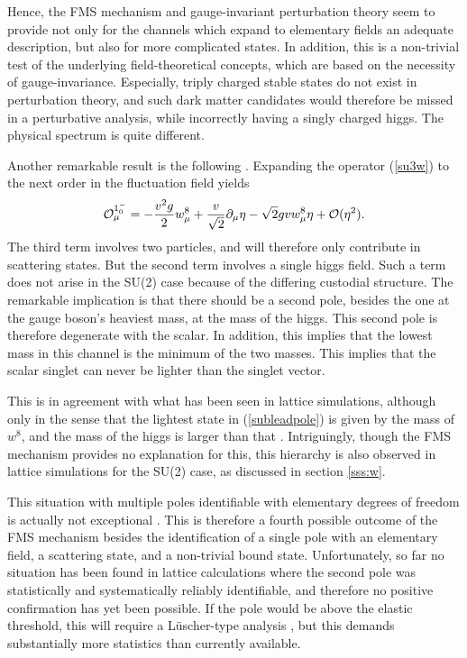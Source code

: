 \documentclass[final,12pt,3p,longtitle]{elsarticle}
\newcommand*{\no}{\noindent}
\newcommand*{\be}{\begin{equation}}
\newcommand*{\ee}{\end{equation}}
\newcommand*{\pd}{\partial}
\newcommand*{\pdm}{\pd_{\mu}}
\newcommand*{\pref}[1]{(\ref{#1})}
\newcommand*{\1}{1\!\!\!\bot}
\newcommand*{\op}{{\cal O}}
\begin{document}
Hence, the FMS mechanism and gauge-invariant perturbation theory seem to provide not only for the channels which expand to elementary fields an adequate description, but also for more complicated states. In addition, this is a non-trivial test of the underlying field-theoretical concepts, which are based on the necessity of gauge-invariance. Especially, triply charged stable states do not exist in perturbation theory, and such dark matter candidates would therefore be missed in a perturbative analysis, while incorrectly having a singly charged higgs. The physical spectrum is quite different.

Another remarkable result is the following \cite{Maas:2017xzh}. Expanding the operator \pref{su3w} to the next order in the fluctuation field yields
\be
\op_\mu^{1^{-}_0}=-\frac{v^{2}g}{2}w_\mu^8+\frac{v}{\sqrt{2}}\pdm\eta-\sqrt{2}gv w_{\mu}^8\eta+\mathcal{O}(\eta^{2}).\label{subleadpole}
\ee
\no The third term involves two particles, and will therefore only contribute in scattering states. But the second term involves a single higgs field. Such a term does not arise in the SU(2) case because of the differing custodial structure. The remarkable implication is that there should be a second pole, besides the one at the gauge boson's heaviest mass, at the mass of the higgs. This second pole is therefore degenerate with the scalar. In addition, this implies that the lowest mass in this channel is the minimum of the two masses. This implies that the scalar singlet can never be lighter than the singlet vector.

This is in agreement with what has been seen in lattice simulations, although only in the sense that the lightest state in \pref{subleadpole} is given by the mass of $w^8$, and the mass of the higgs is larger than that \cite{Maas:unpublishedtoerek}. Intriguingly, though the FMS mechanism provides no explanation for this, this hierarchy is also observed in lattice simulations for the SU(2) case, as discussed in section \ref{sss:w}.

This situation with multiple poles identifiable with elementary degrees of freedom is actually not exceptional \cite{Maas:2017xzh}. This is therefore a fourth possible outcome of the FMS mechanism besides the identification of a single pole with an elementary field, a scattering state, and a non-trivial bound state. Unfortunately, so far no situation has been found in lattice calculations where the second pole was statistically and systematically reliably identifiable, and therefore no positive confirmation has yet been possible. If the pole would be above the elastic threshold, this will require a L\"uscher-type analysis \cite{Gattringer:2010zz,Luscher:1990ux,Luscher:1991cf}, but this demands substantially more statistics than currently available.
\end{document}
